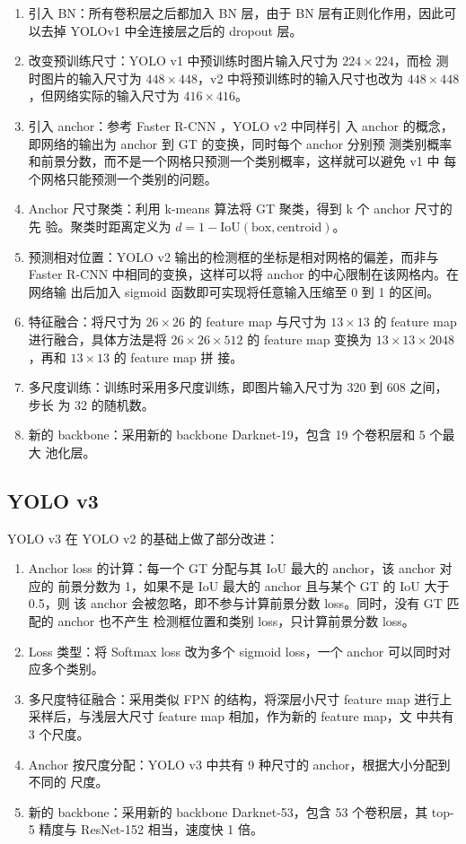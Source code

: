 \begin{enumerate}
  \item 引入 BN：所有卷积层之后都加入 BN 层，由于 BN 层有正则化作用，因此可以去掉
    YOLOv1 中全连接层之后的 dropout 层。
  \item 改变预训练尺寸：YOLO v1 中预训练时图片输入尺寸为 $224 \times 224$，而检
    测时图片的输入尺寸为 $448 \times 448$，v2 中将预训练时的输入尺寸也改为 $448
    \times 448$，但网络实际的输入尺寸为 $416 \times 416$。
  \item 引入 anchor：参考 Faster R-CNN \cite{2015-Faster-RCNN}，YOLO v2 中同样引
    入 anchor 的概念，即网络的输出为 anchor 到 GT 的变换，同时每个 anchor 分别预
    测类别概率和前景分数，而不是一个网格只预测一个类别概率，这样就可以避免 v1 中
    每个网格只能预测一个类别的问题。
  \item Anchor 尺寸聚类：利用 k-means 算法将 GT 聚类，得到 k 个 anchor 尺寸的先
    验。聚类时距离定义为 $d = 1 - \mathrm{IoU}(\mathrm{box}, \mathrm{centroid})$。
  \item 预测相对位置：YOLO v2 输出的检测框的坐标是相对网格的偏差，而非与
    Faster R-CNN 中相同的变换，这样可以将 anchor 的中心限制在该网格内。在网络输
    出后加入 sigmoid 函数即可实现将任意输入压缩至 0 到 1 的区间。
  \item 特征融合：将尺寸为 $26 \times 26$ 的 feature map 与尺寸为 $13 \times 13$
    的 feature map 进行融合，具体方法是将 $26 \times 26 \times 512$ 的 feature
    map 变换为 $13 \times 13 \times 2048$，再和 $13 \times 13$ 的 feature map 拼
    接。
  \item 多尺度训练：训练时采用多尺度训练，即图片输入尺寸为 320 到 608 之间，步长
    为 32 的随机数。
  \item 新的 backbone：采用新的 backbone Darknet-19，包含 19 个卷积层和 5 个最大
    池化层。
\end{enumerate}

\subsection{YOLO v3}
\label{subsec:YOLOv3}
YOLO v3 在 YOLO v2 的基础上做了部分改进：

\begin{enumerate}
  \item Anchor loss 的计算：每一个 GT 分配与其 IoU 最大的 anchor，该 anchor 对应的
    前景分数为 1，如果不是 IoU 最大的 anchor 且与某个 GT 的 IoU 大于 0.5，则
    该 anchor 会被忽略，即不参与计算前景分数 loss。同时，没有 GT 匹配的 anchor 也不产生
    检测框位置和类别 loss，只计算前景分数 loss。
  \item Loss 类型：将 Softmax loss 改为多个 sigmoid loss，一个 anchor 可以同时对
    应多个类别。
  \item 多尺度特征融合：采用类似 FPN\cite{2016-FPN} 的结构，将深层小尺寸 feature
    map 进行上采样后，与浅层大尺寸 feature map 相加，作为新的 feature map，文
    中共有 3 个尺度。
  \item Anchor 按尺度分配：YOLO v3 中共有 9 种尺寸的 anchor，根据大小分配到不同的
    尺度。
  \item 新的 backbone：采用新的 backbone Darknet-53，包含 53 个卷积层，其 top-5
    精度与 ResNet-152 相当，速度快 1 倍。
\end{enumerate}

